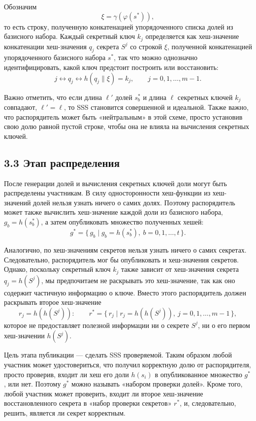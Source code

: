 Обозначим
\[
\xi=\gamma(\varphi(s^{\ast})) ,
\tag{3}
\]
то есть строку, полученную конкатенацией упорядоченного списка долей из базисного набора. Каждый секретный ключ \(k_j\) определяется как хеш-значение конкатенации хеш-значения \(q_j\) секрета \(S^j\) со строкой \(\xi\), полученной конкатенацией упорядоченного базисного набора \(s^{\ast}\), так что можно однозначно идентифицировать, какой ключ предстоит построить или восстановить:
\[
j \longleftrightarrow q_j \longleftrightarrow h(q_j\| \xi)=k_j,\qquad j=0,1,\ldots,m-1 .
\tag{4}
\]

Важно отметить, что если длина \(\ell'\) долей \(s^{\ast}_b\) и длина \(\ell\) секретных ключей \(k_j\) совпадают, \(\ell'=\ell\), то SSS становится совершенной и идеальной. Также важно, что распорядитель может быть «нейтральным» в этой схеме, просто установив свою долю равной пустой строке, чтобы она не влияла на вычисления секретных ключей.

\subsection*{3.3 \quad Этап распределения}

После генерации долей и вычисления секретных ключей доли могут быть распределены участникам. В силу односторонности хеш-функции из хеш-значений долей нельзя узнать ничего о самих долях. Поэтому распорядитель может также вычислить хеш-значение каждой доли из базисного набора, \(g_b=h(s^{\ast}_b)\), а затем опубликовать множество полученных хешей:
\[
g^{\ast}=\{\, g_b \mid g_b=h(s^{\ast}_b),\ b=0,1,\ldots,t \,\}.
\tag{5}
\]

Аналогично, по хеш-значениям секретов нельзя узнать ничего о самих секретах. Следовательно, распорядитель мог бы опубликовать и хеш-значения секретов. Однако, поскольку секретный ключ \(k_j\) также зависит от хеш-значения секрета \(q_j=h(S^j)\), мы предпочитаем не раскрывать это хеш-значение, так как оно содержит частичную информацию о ключе. Вместо этого распорядитель должен раскрывать второе хеш-значение
\[
r_j=h(h(S^j)):
\qquad
r^{\ast}=\{\, r_j \mid r_j=h(h(S^j)),\ j=0,1,\ldots,m-1 \,\},
\tag{6}
\]
которое не предоставляет полезной информации ни о секрете \(S^j\), ни о его первом хеш-значении \(h(S^j)\).

Цель этапа публикации — сделать SSS проверяемой. Таким образом любой участник может удостовериться, что получил корректную долю от распорядителя, просто проверив, входит ли хеш его доли \(h(s_i)\) в опубликованное множество \(g^{\ast}\), или нет. Поэтому \(g^{\ast}\) можно называть «набором проверки долей». Кроме того, любой участник может проверить, входит ли второе хеш-значение восстановленного секрета в «набор проверки секретов» \(r^{\ast}\), и, следовательно, решить, является ли секрет корректным.

